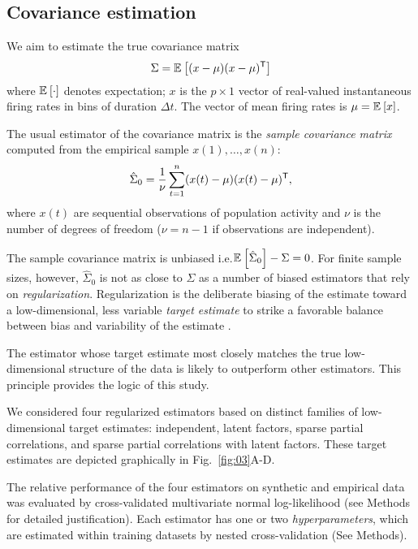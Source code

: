 
\subsection*{Covariance estimation}
We aim to estimate the true covariance matrix 
\begin{equation}
\Sigma = \mathbb E_{}\left[ (x-\mu)(x-\mu)^{\sf T}\right]
\end{equation}
where $\mathbb E_{}\left[ \cdot\right]$ denotes expectation; $x$ is the $p\times 1$ vector of real-valued instantaneous firing rates in bins of duration $\Delta t$. The vector of mean firing rates is $\mu = \mathbb E_{}\left[ x\right]$.  

The usual estimator of the covariance matrix is the \emph{sample covariance matrix} computed from the empirical sample  $x(1),\ldots,x(n)$:
\begin{equation}
\hat \Sigma_0 = \frac 1 \nu \sum\limits_{t=1}^n (x(t)-\mu)(x(t)-\mu)^{\sf T}, 
\end{equation}
where $x(t)$ are sequential observations of population activity and $\nu$ is the number of degrees of freedom ($\nu=n-1$ if observations are independent).

The sample covariance matrix is unbiased i.e.\;$\mathbb E_{}\left[ \hat\Sigma_0\right]-\Sigma=0$.  For finite sample sizes, however, $\hat\Sigma_0$ is not as close to $\Sigma$ as a number of biased estimators that rely on \emph{regularization}. Regularization is the deliberate biasing of the estimate toward a low-dimensional, less variable \emph{target estimate} to strike a favorable balance between bias and variability of the estimate \cite{Bickel:2006,Ledoit:2004}.  

The estimator whose target estimate most closely matches the true low-dimensional structure of the data is likely to outperform other estimators. This principle provides the logic of this study. 

We considered four regularized estimators based on distinct families of low-dimensional target estimates: independent, latent factors, sparse partial correlations, and sparse partial correlations with latent factors. These target estimates are depicted graphically in Fig.~\ref{fig:03}A-D.  

The relative performance of the four estimators on synthetic and empirical data was evaluated by cross-validated multivariate normal log-likelihood (see Methods for detailed justification).  
Each estimator has one or two \emph{hyperparameters}, which are estimated within training datasets by nested cross-validation (See Methods). 

